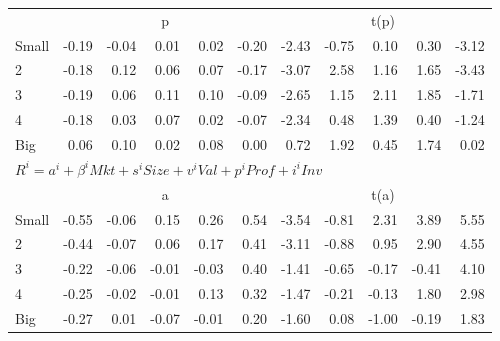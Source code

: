 \begin{table}[H]
\begin{tabular}{lrrrrrrrrrr}
  
     & \multicolumn{5}{c}{p} & \multicolumn{5}{c}{t(p)}   \\
     \cmidrule(r){2-6} \cmidrule(r){7-11} 
    Small  & -0.19  & -0.04  & 0.01  & 0.02  & -0.20  & -2.43  & -0.75  & 0.10  & 0.30  & -3.12   \\
    2  & -0.18  & 0.12  & 0.06  & 0.07  & -0.17  & -3.07  & 2.58  & 1.16  & 1.65  & -3.43   \\
    3  & -0.19  & 0.06  & 0.11  & 0.10  & -0.09  & -2.65  & 1.15  & 2.11  & 1.85  & -1.71   \\
    4  & -0.18  & 0.03  & 0.07  & 0.02  & -0.07  & -2.34  & 0.48  & 1.39  & 0.40  & -1.24   \\
    Big  & 0.06  & 0.10  & 0.02  & 0.08  & 0.00  & 0.72  & 1.92  & 0.45  & 1.74  & 0.02   \\
    

  \midrule
  \multicolumn{11}{l}{$R^i=a^i+\beta^iMkt+s^iSize+v^iVal+p^iProf+i^iInv$}  \\
  
     & \multicolumn{5}{c}{a} & \multicolumn{5}{c}{t(a)}   \\
     \cmidrule(r){2-6} \cmidrule(r){7-11} 
    Small  & -0.55  & -0.06  & 0.15  & 0.26  & 0.54  & -3.54  & -0.81  & 2.31  & 3.89  & 5.55   \\
    2  & -0.44  & -0.07  & 0.06  & 0.17  & 0.41  & -3.11  & -0.88  & 0.95  & 2.90  & 4.55   \\
    3  & -0.22  & -0.06  & -0.01  & -0.03  & 0.40  & -1.41  & -0.65  & -0.17  & -0.41  & 4.10   \\
    4  & -0.25  & -0.02  & -0.01  & 0.13  & 0.32  & -1.47  & -0.21  & -0.13  & 1.80  & 2.98   \\
    Big  & -0.27  & 0.01  & -0.07  & -0.01  & 0.20  & -1.60  & 0.08  & -1.00  & -0.19  & 1.83   \\

  \bottomrule
\end{tabular}
\label{tbl:Size_Prior}
\end{table}